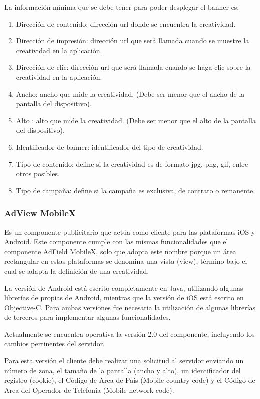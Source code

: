 La información mínima que se debe tener para poder desplegar el banner
es:
\begin{enumerate}
\item Dirección de contenido: dirección url donde se encuentra la creatividad. 
\item Dirección de impresión: dirección url que será llamada cuando se muestre
la creatividad en la aplicación.
\item Dirección de clic: dirección url que será llamada cuando se haga clic
sobre la creatividad en la aplicación. 
\item Ancho: ancho que mide la creatividad. (Debe ser menor que el ancho
de la pantalla del dispositivo). 
\item Alto : alto que mide la creatividad. (Debe ser menor que el alto de
la pantalla del dispositivo). 
\item Identificador de banner: identificador del tipo de creatividad. 
\item Tipo de contenido: define si la creatividad es de formato jpg, png,
gif, entre otros posibles.
\item Tipo de campaña: define si la campaña es exclusiva, de contrato o
remanente.
\end{enumerate}

\subsubsection{AdView MobileX}

Es un componente publicitario que actúa como cliente para las plataformas
iOS y Android. Este componente cumple con las mismas funcionalidades
que el componente AdField MobileX, solo que adopta este nombre porque
un área rectangular en estas plataformas se denomina una vista (view),
término bajo el cual se adapta la definición de una creatividad. 

La versión de Android está escrito completamente en Java, utilizando
algunas librerías de propias de Android, mientras que la versión de
iOS está escrito en Objective-C. Para ambas versiones fue necesaria
la utilización de algunas librerías de terceros para implementar algunas
funcionalidades.

Actualmente se encuentra operativa la versión 2.0 del componente,
incluyendo los cambios pertinentes del servidor.

Para esta versión el cliente debe realizar una solicitud al servidor
enviando un número de zona, el tamaño de la pantalla (ancho y alto),
un identificador del registro (cookie), el Código de Area de País
(Mobile country code) y el Código de Area del Operador de Telefonia
(Mobile network code).


